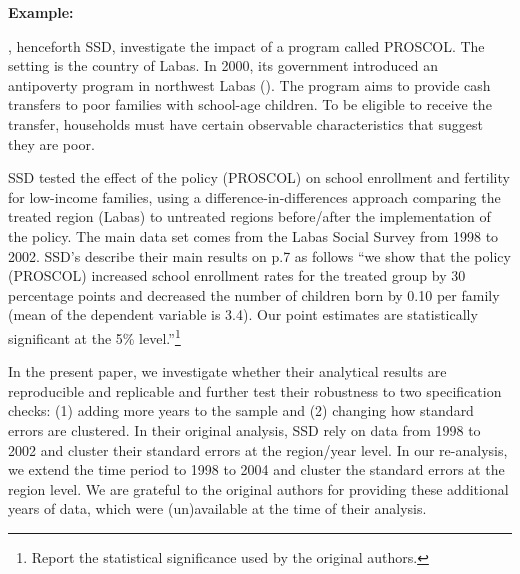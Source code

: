 \documentclass[12pt,a4paper]{article}
\begin{document}
	
	\textbf{Example:} 
	
	\cite{analyst_2022}, henceforth SSD, investigate the impact of a program called PROSCOL. The setting is the country of Labas. In 2000, its government introduced an antipoverty program in northwest Labas (\cite{ravallion2001mystery}). The program aims to provide cash transfers to poor families with school-age children. To be eligible to receive the transfer, households must have certain observable characteristics that suggest they are poor.
	
	SSD tested the effect of the policy (PROSCOL) on school enrollment and fertility for low-income families, using a difference-in-differences approach comparing the treated region (Labas) to untreated regions before/after the implementation of the policy. The main data set comes from the Labas Social Survey from 1998 to 2002. SSD’s describe their main results on p.7 as follows “we show that the policy (PROSCOL) increased school enrollment rates for the treated group by 30 percentage points and decreased the number of children born by 0.10 per family (mean of the dependent variable is 3.4). Our point estimates are statistically significant at the 5\% level.”\footnote{Report the statistical significance used by the original authors.}
	
	In the present paper, we investigate whether their analytical results are reproducible and replicable and further test their robustness to two specification checks: (1) adding more years to the sample and (2) changing how standard errors are clustered. In their original analysis, SSD rely on data from 1998 to 2002 and cluster their standard errors at the region/year level. In our re-analysis, we extend the time period to 1998 to 2004 and cluster the standard errors at the region level. We are grateful to the original authors for providing these additional years of data, which were (un)available at the time of their analysis.
	
\end{document}
